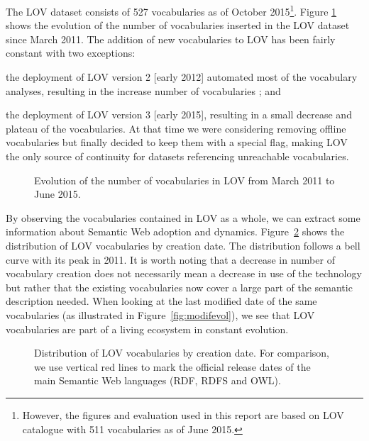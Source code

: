 \documentclass{iosart2c}
\newcommand{\js}[1]{\textcolor{brown}{\textbf{[JS:#1]}}}
\begin{document}
The LOV dataset consists of 527 vocabularies as of October 2015\footnote{However, the figures and evaluation used in this report are based on LOV catalogue with 511 vocabularies as of June 2015.}. Figure \ref{fig:evolLOV} shows the evolution of the number of vocabularies inserted in the LOV dataset since March 2011. The addition of new vocabularies to LOV has been fairly constant with two exceptions: 
\begin{inparaenum}[1)] 
	\item the deployment of LOV version 2 [early 2012] automated most of the vocabulary analyses, resulting in the increase number of vocabularies ; and
	\item the deployment of LOV version 3 [early 2015], resulting in a small decrease and plateau of the vocabularies. At that time we were considering removing offline vocabularies but finally decided to keep them with a special flag, making LOV the only source of continuity for datasets referencing unreachable vocabularies.
		
	
	
\end{inparaenum} 


\begin{figure}[htb]
   \resizebox{1.04\linewidth}{!}{}
   \caption{\label{fig:evolLOV} Evolution of the number of vocabularies in LOV from March 2011 to June 2015.
   }
\end{figure}


By observing the vocabularies contained in LOV as a whole, we can extract some information about Semantic Web adoption and dynamics. Figure~\ref{fig:creaevol} shows the distribution of LOV vocabularies by creation date. The distribution follows a bell curve with its peak in 2011. It is worth noting that a decrease in number of vocabulary creation does not necessarily mean a decrease in use of the technology but rather that the existing vocabularies now cover a large part of the semantic description needed. When looking at the last modified date of the same vocabularies (as illustrated in Figure~\ref{fig:modifevol}), we see that LOV vocabularies are part of a living ecosystem in constant evolution. 

\begin{figure}[htb]
\resizebox{\linewidth}{!}{}
\caption{\label{fig:creaevol} Distribution of LOV vocabularies by creation date. For comparison, we use vertical red lines to mark the official release dates of the main Semantic Web languages (RDF, RDFS and OWL).}
\end{figure}
\end{document}
